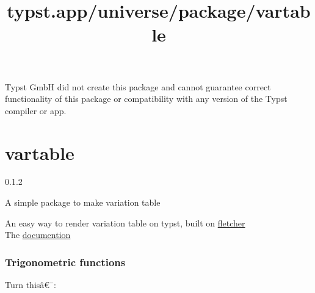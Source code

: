 Typst GmbH did not create this package and cannot guarantee correct
functionality of this package or compatibility with any version of the
Typst compiler or app.


\title{typst.app/universe/package/vartable}

\label{banner}
\section{vartable}\label{vartable}

{ 0.1.2 }

A simple package to make variation table

\label{readme}
An easy way to render variation table on typst, built on
\href{https://github.com/Jollywatt/typst-fletcher}{fletcher}\\
The
\href{https://github.com/Le-foucheur/Typst-VarTable/blob/main/documentation.pdf}{documention}

\begin{Shaded}
\begin{Highlighting}[]
\end{Highlighting}
\end{Shaded}

\subsubsection{Trigonometric functions}\label{trigonometric-functions}

Turn thisâ€¯:

